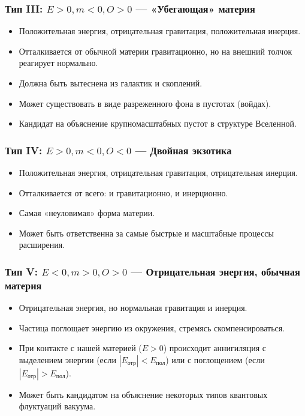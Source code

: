 \documentclass[12pt,a4paper]{article}
\begin{document}
\subsubsection{Тип III: $E > 0, m < 0, O > 0$ --- «Убегающая» материя}
\begin{itemize}
    \item Положительная энергия, отрицательная гравитация, положительная инерция.
    \item Отталкивается от обычной материи гравитационно, но на внешний толчок реагирует нормально.
    \item Должна быть вытеснена из галактик и скоплений.
    \item Может существовать в виде разреженного фона в пустотах (войдах).
    \item Кандидат на объяснение крупномасштабных пустот в структуре Вселенной.
\end{itemize}

\subsubsection{Тип IV: $E > 0, m < 0, O < 0$ --- Двойная экзотика}
\begin{itemize}
    \item Положительная энергия, отрицательная гравитация, отрицательная инерция.
    \item Отталкивается от всего: и гравитационно, и инерционно.
    \item Самая «неуловимая» форма материи.
    \item Может быть ответственна за самые быстрые и масштабные процессы расширения.
\end{itemize}

\subsubsection{Тип V: $E < 0, m > 0, O > 0$ --- Отрицательная энергия, обычная материя}
\begin{itemize}
    \item Отрицательная энергия, но нормальная гравитация и инерция.
    \item Частица поглощает энергию из окружения, стремясь скомпенсироваться.
    \item При контакте с нашей материей ($E > 0$) происходит аннигиляция с выделением энергии (если $|E_{\text{отр}}| < E_{\text{пол}}$) или с поглощением (если $|E_{\text{отр}}| > E_{\text{пол}}$).
    \item Может быть кандидатом на объяснение некоторых типов квантовых флуктуаций вакуума.
\end{itemize}
\end{document}
